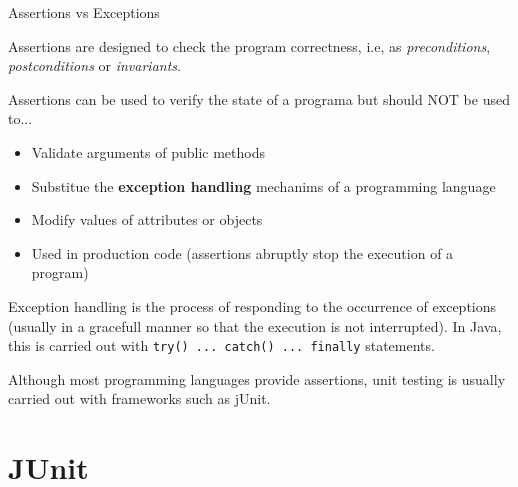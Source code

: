 \documentclass[11pt, xcolor=svgnames]{beamer}
\begin{document}
\begin{frame}[fragile]{Assertions vs Exceptions}

Assertions are designed to check the program correctness, i.e, as \emph{preconditions}, \emph{postconditions} or \emph{invariants}.

Assertions can be used to verify the state of a programa but should NOT be used to... 
\begin{itemize}
\item Validate arguments of public methods
\item Substitue the \textbf{exception handling} mechanims of a programming language
\item Modify values of attributes or objects
\item Used in production code (assertions abruptly stop the execution of a program)
\end{itemize}

Exception handling is the process of responding to the occurrence of exceptions (usually in a gracefull manner so that the execution is not interrupted). In Java, this is carried out with \texttt{try() ... catch() ... finally} statements.

Although most programming languages provide assertions, unit testing is usually carried out with frameworks such as jUnit. 

\end{frame}



\section{JUnit}

\end{document}
